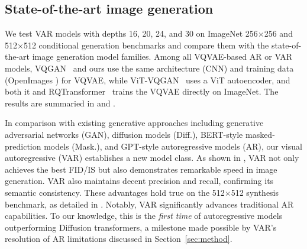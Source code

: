 \vspace{-0.8pt}
\subsection{State-of-the-art image generation} \label{sec:sota}
\vspace{-0.8pt}

We test VAR models with depths 16, 20, 24, and 30 on ImageNet 256$\times$256 and 512$\times$512 conditional generation benchmarks and compare them with the state-of-the-art image generation model families.
Among all VQVAE-based AR or VAR models, VQGAN~\cite{vqgan} and ours use the same architecture (CNN) and training data (OpenImages \cite{openimages}) for VQVAE, while ViT-VQGAN~\cite{vit-vqgan} uses a ViT autoencoder, and both it and RQTransformer~\cite{rq} trains the VQVAE directly on ImageNet.
The results are summaried in  and .


In comparison with existing generative approaches including generative adversarial networks (GAN), diffusion models (Diff.), BERT-style masked-prediction models (Mask.), and GPT-style autoregressive models (AR), our visual autoregressive (VAR) establishes a new model class.
As shown in , VAR not only achieves the best FID/IS but also demonstrates remarkable speed in image generation.
VAR also maintains decent precision and recall, confirming its semantic consistency.
These advantages hold true on the 512$\times$512 synthesis benchmark, as detailed in .
Notably, VAR significantly advances traditional AR capabilities. To our knowledge, this is the \textit{first time} of autoregressive models outperforming Diffusion transformers, a milestone made possible by VAR's resolution of AR limitations discussed in Section~\ref{sec:method}.


